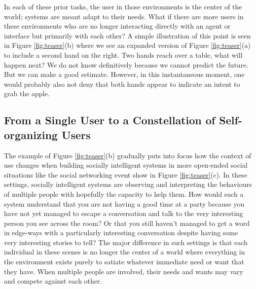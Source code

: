 \documentclass[sigconf]{acmart}
\begin{document}
In each of these prior tasks, the user in those environments is the center of the world; systems are meant adapt to their needs. What if there are more users in these environments who are no longer interacting directly with an agent or interface but primarily with each other? A simple illustration of this point is seen in Figure \ref{fig:teaser}(b) where we see an expanded version of Figure \ref{fig:teaser}(a) to include a second hand on the right. Two hands reach over a table, what will happen next? We do not know definitively because we cannot predict the future. But we can make a good estimate. However, in this instantaneous moment, one would probably also not deny that both hands appear to indicate an intent to grab the apple.  

\subsection{From a Single User to a Constellation of Self-organizing Users}
The example of Figure \ref{fig:teaser}(b) gradually puts into focus how the context of use changes when building socially intelligent systems in more open-ended social situations like the social networking event show in Figure \ref{fig:teaser}(c). In these settings, socially intelligent systems are observing and interpreting the behaviours of multiple people with hopefully the capacity to help them. How would such a system understand that you are not having a good time at a party because you have not yet managed to escape a conversation and talk to the very interesting person you see across the room? Or that you still haven't managed to get a word in edge-ways with a particularly interesting conversation despite having some very interesting stories to tell? The major difference in such settings is that each individual in these scenes is no longer the center of a world where everything in the environment exists purely to satiate whatever immediate need or want that they have. When multiple people are involved, their needs and wants may vary and compete against each other.

\end{document}
